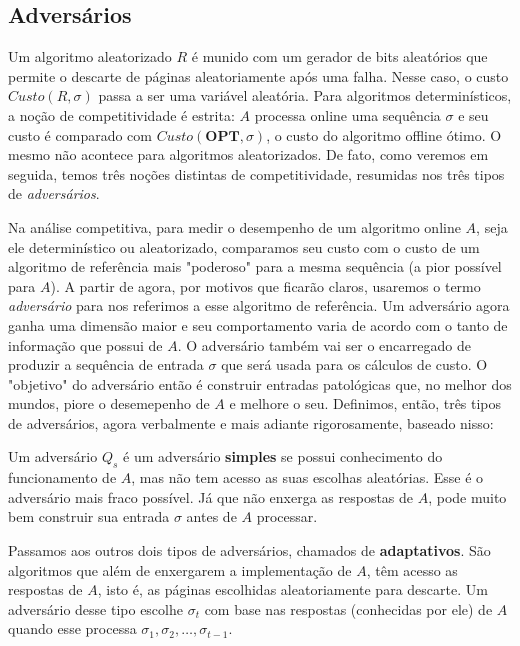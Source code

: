 \subsection{Adversários}

Um algoritmo aleatorizado \(R\) é munido com um gerador de bits aleatórios que permite o descarte de páginas aleatoriamente após uma falha. Nesse caso, o custo \(Custo(R,\sigma)\) passa a ser uma variável aleatória. Para algoritmos determinísticos, a noção de competitividade é estrita: \(A\) processa online uma sequência \(\sigma\) e seu custo é comparado com \(Custo(\textbf{OPT}, \sigma)\), o custo do algoritmo offline ótimo. O mesmo não acontece para algoritmos aleatorizados. De fato, como veremos em seguida, temos três noções distintas de competitividade, resumidas nos três tipos de \textit{adversários}. 

Na análise competitiva, para medir o desempenho de um algoritmo online \(A\), seja ele determinístico ou aleatorizado, comparamos seu custo com o custo de um algoritmo de referência mais "poderoso" para a mesma sequência (a pior possível para \(A\)). 
A partir de agora, por motivos que ficarão claros, usaremos o termo \textit{adversário} para nos referimos a esse algoritmo de referência. Um adversário agora ganha uma dimensão maior e seu comportamento varia de acordo com o tanto de informação que possui de \(A\). O adversário também vai ser o encarregado de produzir a sequência de entrada \(\sigma\) que será usada para os cálculos de custo. O "objetivo" do adversário então é construir entradas patológicas que, no melhor dos mundos, piore o desemepenho de \(A\) e melhore o seu. Definimos, então, três tipos de adversários, agora verbalmente e mais adiante rigorosamente, baseado nisso:

\begin{definition}
  Um adversário \(Q_s\) é um adversário \textbf{simples} se possui conhecimento do funcionamento de \(A\), mas não tem acesso as suas escolhas aleatórias. Esse é o adversário mais fraco possível. Já que não enxerga as respostas de \(A\), pode muito bem construir sua entrada \(\sigma\) antes de \(A\) processar. 
\end{definition}

Passamos aos outros dois tipos de adversários, chamados de \textbf{adaptativos}. São algoritmos que além de enxergarem a implementação de \(A\), têm acesso as respostas de \(A\), isto é, as páginas escolhidas aleatoriamente para descarte. Um adversário desse tipo escolhe \(\sigma_t\) com base nas respostas (conhecidas por ele) de \(A\) quando esse processa \(\sigma_1, \sigma_2, \dots, \sigma_{t-1}\).

